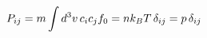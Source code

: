 \documentclass[preview]{standalone}
\begin{document}
\begin{align*}
\special{dvisvgm:raw <g id='unique000'>}P_{ij}=m\int d^3v\,c_ic_jf_0=nk_BT\,\delta_{ij}=p\,\delta_{ij}\special{dvisvgm:raw </g>}
\end{align*}
\end{document}
